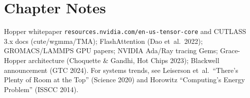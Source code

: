 \section{Chapter Notes}
Hopper whitepaper \texttt{resources.nvidia.com/en-us-tensor-core} and CUTLASS 3.x docs (cute/wgmma/TMA); FlashAttention (Dao et~al.\ 2022); GROMACS/LAMMPS GPU papers; NVIDIA Ada/Ray tracing Gems; Grace-Hopper architecture (Choquette \& Gandhi, Hot Chips 2023); Blackwell announcement (GTC 2024). For systems trends, see Leiserson et~al.\ ``There's Plenty of Room at the Top'' (Science 2020) and Horowitz ``Computing's Energy Problem'' (ISSCC 2014).
